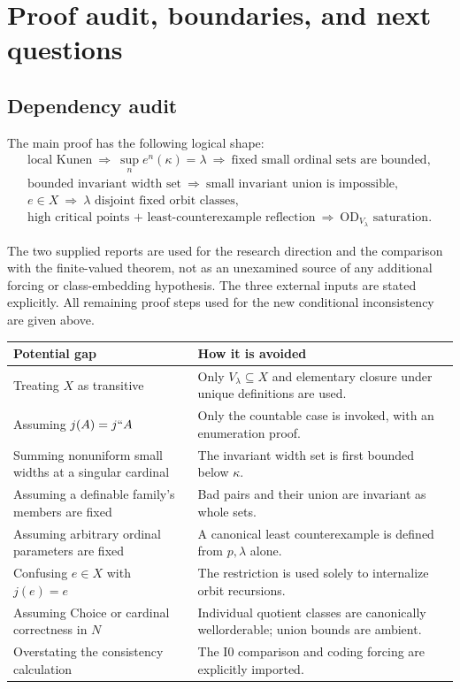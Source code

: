 \documentclass[11pt,letterpaper]{article}
\theoremstyle{definition}
\numberwithin{equation}{section}
\newcommand{\OD}{\mathrm{OD}}
\newcommand{\Izero}{\mathrm{I0}}
\begin{document}
\section{Proof audit, boundaries, and next questions}\label{sec:audit}

\subsection{Dependency audit}

The main proof has the following logical shape:
\[
\begin{gathered}
 \text{local Kunen}
 \ \Longrightarrow\ \sup_n e^n(\kappa)=\lambda
 \ \Longrightarrow\ \text{fixed small ordinal sets are bounded},\\
 \text{bounded invariant width set}
 \ \Longrightarrow\ \text{small invariant union is impossible},\\
 e\in X\ \Longrightarrow\ \lambda\text{ disjoint fixed orbit classes},\\
 \text{high critical points + least-counterexample reflection}
 \ \Longrightarrow\ \OD_{V_\lambda}\text{ saturation}.
\end{gathered}
\]

The two supplied reports are used for the research direction and the comparison with the finite-valued theorem, not as an unexamined source of any additional forcing or class-embedding hypothesis. The three external inputs are stated explicitly. All remaining proof steps used for the new conditional inconsistency are given above.

\begin{center}
\small
\renewcommand{\arraystretch}{1.17}
\begin{tabularx}{\textwidth}{@{}P{.39\textwidth}Y@{}}
\toprule
\textbf{Potential gap}&\textbf{How it is avoided}\\\midrule
Treating $X$ as transitive&Only $V_\lambda\subseteq X$ and elementary closure under unique definitions are used.\\
Assuming $j(A)=j``A$&Only the countable case is invoked, with an enumeration proof.\\
Summing nonuniform small widths at a singular cardinal&The invariant width set is first bounded below $\kappa$.\\
Assuming a definable family's members are fixed&Bad pairs and their union are invariant as whole sets.\\
Assuming arbitrary ordinal parameters are fixed&A canonical least counterexample is defined from $p,\lambda$ alone.\\
Confusing $e\in X$ with $j(e)=e$&The restriction is used solely to internalize orbit recursions.\\
Assuming Choice or cardinal correctness in $N$&Individual quotient classes are canonically wellorderable; union bounds are ambient.\\
Overstating the consistency calculation&The $\Izero$ comparison and coding forcing are explicitly imported.\\
\bottomrule
\end{tabularx}
\end{center}
\end{document}

